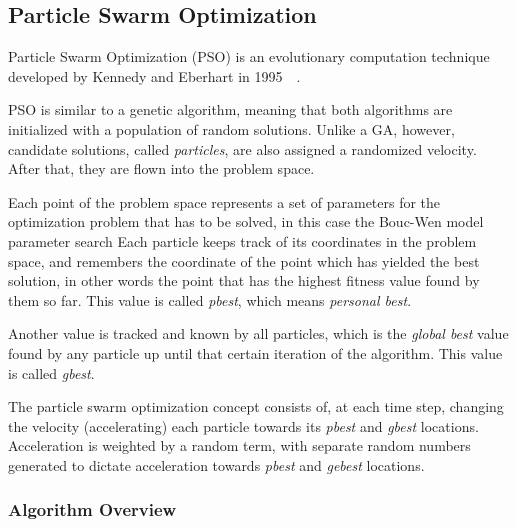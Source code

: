 \subsection{Particle Swarm Optimization}
\label{sec:5.pso}

Particle Swarm Optimization (PSO) is an evolutionary computation technique
developed by Kennedy and Eberhart in 1995~\cite{kennedy2011particle}~\cite{eberhart1995new}.

PSO is similar to a genetic algorithm, meaning that both algorithms 
are initialized with a population of random solutions. Unlike a GA, however,
candidate solutions, called \textit{particles}, are also assigned a randomized velocity.
After that, they are flown into the problem space.

Each point of the problem space represents a set of parameters for the optimization
problem that has to be solved, in this case the Bouc-Wen model parameter search
Each particle keeps track of its coordinates in the problem space,
and remembers the coordinate of the point which has yielded the best solution,
in other words the point that has the highest fitness value found by them so far.
This value is called \textit{pbest}, which means \textit{personal best}.

Another value is tracked and known by all particles, which is the \textit{global best}
value found by any particle up until that certain iteration of the algorithm.
This value is called \textit{gbest}.

The particle swarm optimization concept consists of, at each time step,
changing the velocity (accelerating) each particle towards its \textit{pbest}
and \textit{gbest} locations. Acceleration is weighted by a random term,
with separate random numbers generated to dictate acceleration towards
\textit{pbest} and \textit{gebest} locations.


\subsubsection{Algorithm Overview}

